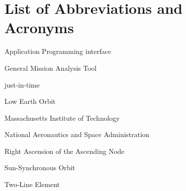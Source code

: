 \chapter{List of Abbreviations and Acronyms}

 
\begin{description}[leftmargin=*, widest=DCCHTM]
    
    \item[API]
    Application Programming interface

    \item[GMAT]
    General Mission Analysis Tool

    \item[JIT]
    just-in-time

    \item[LEO]
    Low Earth Orbit

    \item[MIT]
    Massachusetts Institute of Technology 

    \item[NASA]
    National Aeronautics and Space Administration

    \item[RAAN]
    Right Ascension of the Ascending Node

    \item[SSO]
    Sun-Synchronous Orbit

    \item[TLE]
    Two-Line Element
    
    
    
\end{description}